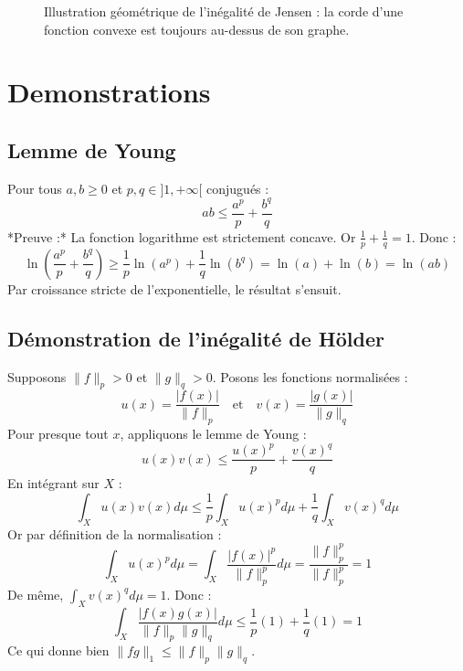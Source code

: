 \documentclass[11pt,a4paper]{article}
\begin{document}
\begin{figure}[h]
    \centering
    \caption{Illustration géométrique de l'inégalité de Jensen : la corde d'une fonction convexe est toujours au-dessus de son graphe.}
\end{figure}

\section{Demonstrations}

\subsection{Lemme de Young}
Pour tous $a, b \ge 0$ et $p, q \in ]1, +\infty[$ conjugués :
$$ ab \le \frac{a^p}{p} + \frac{b^q}{q} $$
*Preuve :* La fonction logarithme est strictement concave. Or $\frac{1}{p} + \frac{1}{q} = 1$. Donc :
$$ \ln\left( \frac{a^p}{p} + \frac{b^q}{q} \right) \ge \frac{1}{p}\ln(a^p) + \frac{1}{q}\ln(b^q) = \ln(a) + \ln(b) = \ln(ab) $$
Par croissance stricte de l'exponentielle, le résultat s'ensuit.

\subsection{Démonstration de l'inégalité de Hölder}
Supposons $\|f\|_p > 0$ et $\|g\|_q > 0$. Posons les fonctions normalisées :
$$ u(x) = \frac{|f(x)|}{\|f\|_p} \quad \text{et} \quad v(x) = \frac{|g(x)|}{\|g\|_q} $$
Pour presque tout $x$, appliquons le lemme de Young :
$$ u(x)v(x) \le \frac{u(x)^p}{p} + \frac{v(x)^q}{q} $$
En intégrant sur $X$ :
$$ \int_X u(x)v(x) d\mu \le \frac{1}{p} \int_X u(x)^p d\mu + \frac{1}{q} \int_X v(x)^q d\mu $$
Or par définition de la normalisation :
$$ \int_X u(x)^p d\mu = \int_X \frac{|f(x)|^p}{\|f\|_p^p} d\mu = \frac{\|f\|_p^p}{\|f\|_p^p} = 1 $$
De même, $\int_X v(x)^q d\mu = 1$.
Donc :
$$ \int_X \frac{|f(x)g(x)|}{\|f\|_p \|g\|_q} d\mu \le \frac{1}{p}(1) + \frac{1}{q}(1) = 1 $$
Ce qui donne bien $\|fg\|_1 \le \|f\|_p \|g\|_q$.
\end{document}
